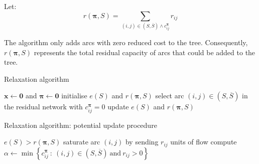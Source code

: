 \begin{defn} \label{defn:relax-tree-residual}
Let:
\begin{equation} \label{eq:relax-tree-residual}
r(\boldsymbol{\pi},S) = \sum_{(i,j) \in \left(S,\overline{S}\right) \land c_{ij}^{\boldsymbol{\pi}}} r_{ij}
\end{equation}
\end{defn}

\begin{remark}
The algorithm only adds arcs with zero reduced cost to the tree. Consequently, $r(\boldsymbol{\pi},S)$ represents the total residual capacity of arcs that could be added to the tree.
\end{remark}

\begin{algorithm}
    \caption{Relaxation algorithm}
    \label{algo:relaxation}
    \begin{algorithmic}[1]
        \State $\mathbf{x} \gets \mathbf{0}$ and $\boldsymbol{\pi} \gets \mathbf{0}$
        \State initialise $e(S)$ and $r(\boldsymbol{\pi},S)$
        \EndIf
        \State select arc $(i,j) \in \left(S,\overline{S}\right)$ in the residual network with $c_{ij}^{\boldsymbol{\pi}}=0$
        \State update $e(S)$ and $r(\boldsymbol{\pi},S)$
        \Else
        \State {}
        \Break
        \EndIf
        \EndWhile
        \EndIf
        \EndWhile
    \end{algorithmic}
\end{algorithm}

\begin{algorithm}
    \caption{Relaxation algorithm: potential update procedure}
    \label{algo:relaxation-update-potentials}
    \begin{algorithmic}[1]
        \Require $e(S) > r(\boldsymbol{\pi},S)$
        \Statex
        \State saturate arc $(i,j)$ by sending $r_{ij}$ units of flow
        \EndFor
        \State compute $\alpha \gets \min\left\{c_{ij}^{\boldsymbol{\pi}}\::\:(i,j)\in\left(S,\overline{S}\right)\:\mbox{and}\:r_{ij}>0\right\}$
        \EndFor
        \EndFunction
    \end{algorithmic}
\end{algorithm}

